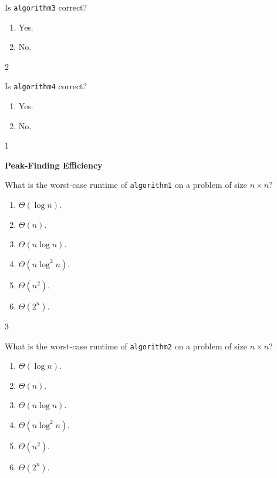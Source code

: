 \documentclass[12pt,twoside]{article}
\begin{document}
\begin{problems}
\begin{problemparts}
\problempart {} Is \texttt{algorithm3} correct?
\begin{enumerate}
\item Yes.
\item No.
\end{enumerate}

\ifsolution \solution{}
2
\fi

\problempart {} Is \texttt{algorithm4} correct?
\begin{enumerate}
\item Yes.
\item No.
\end{enumerate}

\ifsolution \solution{}
1
\fi

\end{problemparts}

\problem {} \textbf{Peak-Finding Efficiency}

\begin{problemparts}

\problempart {} What is the worst-case runtime of \texttt{algorithm1} on a problem of size $n \times n$?
\begin{enumerate}
\item $\Theta(\log n)$.
\item $\Theta(n)$.
\item $\Theta(n \log n)$.
\item $\Theta(n \log^2 n)$.
\item $\Theta(n^2)$.
\item $\Theta(2^n)$.
\end{enumerate}

\ifsolution \solution{}
3
\fi

\problempart {} What is the worst-case runtime of \texttt{algorithm2} on a problem of size $n \times n$?
\begin{enumerate}
\item $\Theta(\log n)$.
\item $\Theta(n)$.
\item $\Theta(n \log n)$.
\item $\Theta(n \log^2 n)$.
\item $\Theta(n^2)$.
\item $\Theta(2^n)$.
\end{enumerate}


\end{problemparts}
\end{problems}
\end{document}
